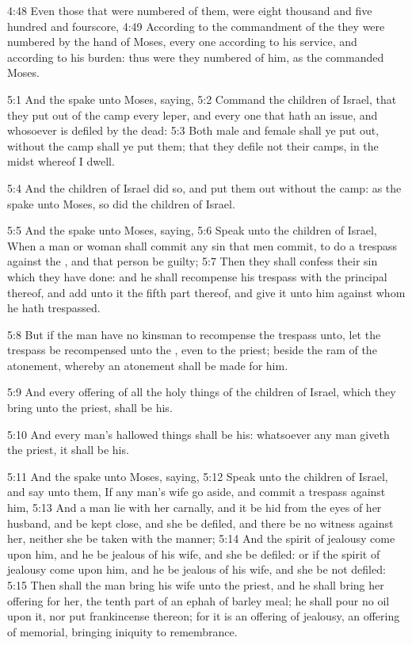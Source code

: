 4:48 Even those that were numbered of them, were eight thousand and
five hundred and fourscore, 4:49 According to the commandment of the
\LORD they were numbered by the hand of Moses, every one according to
his service, and according to his burden: thus were they numbered of
him, as the \LORD commanded Moses.

5:1 And the \LORD spake unto Moses, saying, 5:2 Command the children of
Israel, that they put out of the camp every leper, and every one that
hath an issue, and whosoever is defiled by the dead: 5:3 Both male and
female shall ye put out, without the camp shall ye put them; that they
defile not their camps, in the midst whereof I dwell.

5:4 And the children of Israel did so, and put them out without the
camp: as the \LORD spake unto Moses, so did the children of Israel.

5:5 And the \LORD spake unto Moses, saying, 5:6 Speak unto the children
of Israel, When a man or woman shall commit any sin that men commit,
to do a trespass against the \LORD, and that person be guilty; 5:7 Then
they shall confess their sin which they have done: and he shall
recompense his trespass with the principal thereof, and add unto it
the fifth part thereof, and give it unto him against whom he hath
trespassed.

5:8 But if the man have no kinsman to recompense the trespass unto,
let the trespass be recompensed unto the \LORD, even to the priest;
beside the ram of the atonement, whereby an atonement shall be made
for him.

5:9 And every offering of all the holy things of the children of
Israel, which they bring unto the priest, shall be his.

5:10 And every man's hallowed things shall be his: whatsoever any man
giveth the priest, it shall be his.

5:11 And the \LORD spake unto Moses, saying, 5:12 Speak unto the
children of Israel, and say unto them, If any man's wife go aside, and
commit a trespass against him, 5:13 And a man lie with her carnally,
and it be hid from the eyes of her husband, and be kept close, and she
be defiled, and there be no witness against her, neither she be taken
with the manner; 5:14 And the spirit of jealousy come upon him, and he
be jealous of his wife, and she be defiled: or if the spirit of
jealousy come upon him, and he be jealous of his wife, and she be not
defiled: 5:15 Then shall the man bring his wife unto the priest, and
he shall bring her offering for her, the tenth part of an ephah of
barley meal; he shall pour no oil upon it, nor put frankincense
thereon; for it is an offering of jealousy, an offering of memorial,
bringing iniquity to remembrance.

